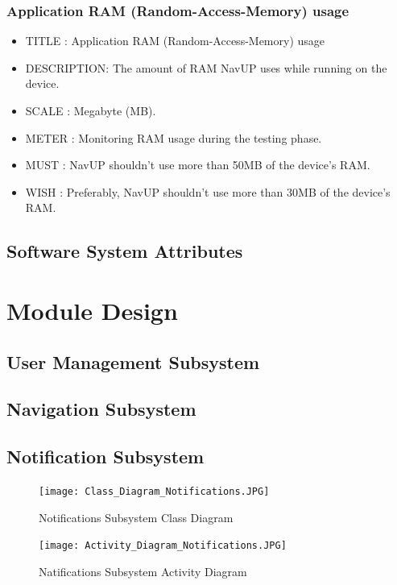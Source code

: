 \documentclass{article}
\begin{document}
		    \subsubsection{Application RAM (Random-Access-Memory) usage}
			\begin{itemize}
		    \item[]TITLE      : Application RAM (Random-Access-Memory) usage
		    \item[]DESCRIPTION: The amount of RAM NavUP uses while running on the device. 
		    \item[]SCALE      : Megabyte (MB).
		    \item[]METER      : Monitoring RAM usage during the testing phase.
		    \item[]MUST       : NavUP shouldn't use more than 50MB of the device's RAM.
		    \item[]WISH       : Preferably, NavUP shouldn't use more than 30MB of the device's RAM.
		    \end{itemize}
			\subsection{Software System Attributes}\label{subsec:attributes}

		\newpage

		\section{Module Design}\label{sec:moduels}	
      \subsection{User Management Subsystem}\label{subsec:users}
			\subsection{Navigation Subsystem}\label{subsec:navigation}
			
			\subsection{Notification Subsystem}\label{subsec:notification}
			
				\begin{figure}[h!]
					\texttt{[image: Class\_Diagram\_Notifications.JPG]}
					\caption{Notifications Subsystem Class Diagram}	
				\end{figure}
			
				\begin{figure}[h!]
					\texttt{[image: Activity\_Diagram\_Notifications.JPG]}
					\caption{Natifications Subsystem Activity Diagram}	
				\end{figure}
				
\end{document}
